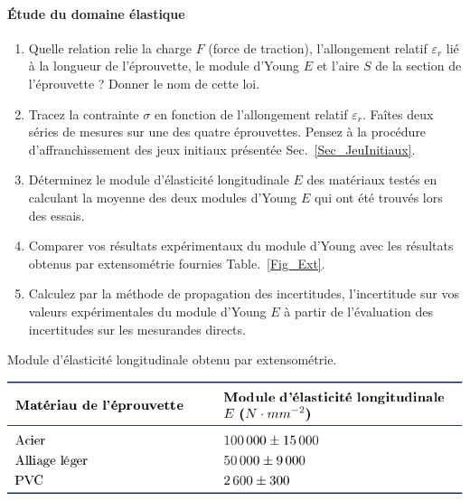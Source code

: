 \documentclass[lecture.tex]{subfiles}
\begin{document}
\paragraph*{Étude du domaine élastique}
\begin{enumerate}
\item {} Quelle relation relie la charge $F$ (force de traction),  l'allongement relatif $\varepsilon_r$  lié à la longueur de l'éprouvette, le module d'Young $E$ et l'aire $S$ de la section de l'éprouvette ? Donner le nom de cette loi.
\item Tracez la contrainte $\sigma$ en fonction de l'allongement relatif $\varepsilon_r$. Faîtes deux séries de mesures sur une des quatre éprouvettes. Pensez à la procédure d'affranchissement des jeux initiaux présentée Sec.~\ref{Sec_JeuInitiaux}.
\item Déterminez le module d'élasticité longitudinale $E$ des matériaux testés en calculant la moyenne des deux modules d'Young $E$ qui ont été trouvés lors des essais.
\item Comparer vos résultats expérimentaux du module d'Young avec les résultats obtenus par extensométrie fournies Table.~\ref{Fig_Ext}.
\item Calculez par la méthode de propagation des incertitudes, l'incertitude sur vos valeurs expérimentales du module d'Young $E$ à partir de l'évaluation des incertitudes sur les mesurandes directs.
\end{enumerate}

\begin{table}[h!]
\caption{Module d'élasticité longitudinale obtenu par extensométrie.}
\begin{center}
\includegraphics[scale=1]{Table_Extensometrie.pdf}
\label{Fig_Ext}
\end{center}
\end{table}
\end{document}
